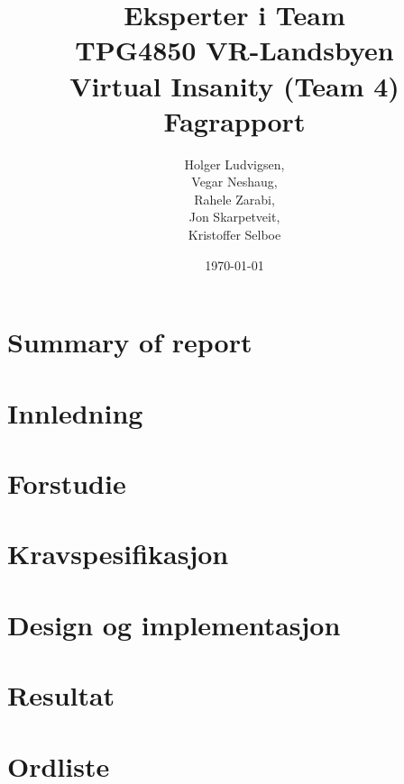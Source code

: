 \documentclass[12pt]{report}
\title{{\Large Eksperter i Team\\TPG4850 VR-Landsbyen\\{\bf Virtual Insanity (Team 4)\\Fagrapport}}}
\author{Holger Ludvigsen,\\Vegar Neshaug,\\Rahele Zarabi,\\Jon Skarpetveit,\\Kristoffer Selboe}
\date{{\small \today}}
\begin{document}
\maketitle

\chapter{Summary of report}
	
\pagebreak
	
\setlength{\parskip}{0.0in}
\tableofcontents
\setlength{\parskip}{0.1in}

\chapter{Innledning}

	

\chapter{Forstudie}

	

\chapter{Kravspesifikasjon}

	
	
\chapter{Design og implementasjon}

	

\chapter{Resultat}

	



\chapter{Ordliste}

	

%	
%
\end{document}
